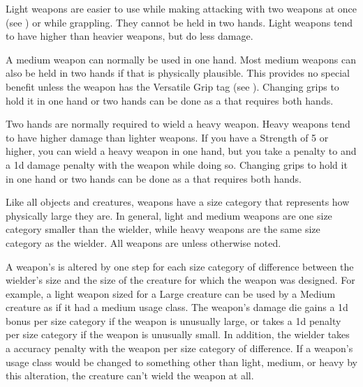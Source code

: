             \label{Light Weapons} Light weapons are easier to use while making attacking with two weapons at once (see ) or while grappling.
            They cannot be held in two hands.
            Light weapons tend to have higher  than heavier weapons, but do less damage.

             A medium weapon can normally be used in one hand.
            Most medium weapons can also be held in two hands if that is physically plausible.
            This provides no special benefit unless the weapon has the Versatile Grip tag (see ).
            Changing grips to hold it in one hand or two hands can be done as a  that requires both hands.

             Two hands are normally required to wield a heavy weapon.
            Heavy weapons tend to have higher damage than lighter weapons.
            If you have a Strength of 5 or higher, you can wield a heavy weapon in one hand, but you take a  penalty to  and a \minus1d damage penalty with the weapon while doing so.
            Changing grips to hold it in one hand or two hands can be done as a  that requires both hands.

             Like all objects and creatures, weapons have a size category that represents how physically large they are. In general, light and medium weapons are one size category smaller than the wielder, while heavy weapons are the same size category as the wielder.
            All weapons are  unless otherwise noted.

            \label{Inappropriately Sized Weapons} A weapon's  is altered by one step for each size category of difference between the wielder's size and the size of the creature for which the weapon was designed.
            For example, a light weapon sized for a Large creature can be used by a Medium creature as if it had a medium usage class.
            The weapon's damage die gains a \plus1d bonus per size category if the weapon is unusually large, or takes a \minus1d penalty per size category if the weapon is unusually small.
            In addition, the wielder takes a  accuracy penalty with the weapon per size category of difference.
            If a weapon's usage class would be changed to something other than light, medium, or heavy by this alteration, the creature can't wield the weapon at all.

